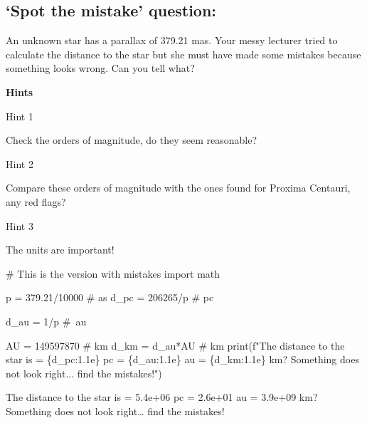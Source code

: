 \documentclass[
  letterpaper,
  DIV=11,
  numbers=noendperiod]{scrreprt}
\newenvironment{Shaded}{\begin{snugshade}}{\end{snugshade}}
\newcommand{\BuiltInTok}[1]{\textcolor[rgb]{0.00,0.23,0.31}{#1}}
\newcommand{\CommentTok}[1]{\textcolor[rgb]{0.37,0.37,0.37}{#1}}
\newcommand{\DecValTok}[1]{\textcolor[rgb]{0.68,0.00,0.00}{#1}}
\newcommand{\FloatTok}[1]{\textcolor[rgb]{0.68,0.00,0.00}{#1}}
\newcommand{\ImportTok}[1]{\textcolor[rgb]{0.00,0.46,0.62}{#1}}
\newcommand{\NormalTok}[1]{\textcolor[rgb]{0.00,0.23,0.31}{#1}}
\newcommand{\OperatorTok}[1]{\textcolor[rgb]{0.37,0.37,0.37}{#1}}
\newcommand{\SpecialCharTok}[1]{\textcolor[rgb]{0.37,0.37,0.37}{#1}}
\newcommand{\SpecialStringTok}[1]{\textcolor[rgb]{0.13,0.47,0.30}{#1}}
\begin{document}
\hypertarget{spot-the-mistake-question}{%
\subsection{`Spot the mistake'
question:}\label{spot-the-mistake-question}}

An unknown star has a parallax of 379.21 mas. Your messy lecturer tried
to calculate the distance to the star but she must have made some
mistakes because something looks wrong. Can you tell what?

\textbf{Hints}

Hint 1

Check the orders of magnitude, do they seem reasonable?

Hint 2

Compare these orders of magnitude with the ones found for Proxima
Centauri, any red flags?

Hint 3

The units are important!

\begin{Shaded}
\begin{Highlighting}[]
\CommentTok{\# This is the version with mistakes}
\ImportTok{import}\NormalTok{ math}

\NormalTok{p }\OperatorTok{=} \FloatTok{379.21}\OperatorTok{/}\DecValTok{10000} \CommentTok{\# as }
\NormalTok{d\_pc }\OperatorTok{=} \DecValTok{206265}\OperatorTok{/}\NormalTok{p }\CommentTok{\# pc}

\NormalTok{d\_au }\OperatorTok{=} \DecValTok{1}\OperatorTok{/}\NormalTok{p }\CommentTok{\# au}

\NormalTok{AU }\OperatorTok{=} \DecValTok{149597870} \CommentTok{\# km}
\NormalTok{d\_km }\OperatorTok{=}\NormalTok{ d\_au}\OperatorTok{*}\NormalTok{AU }\CommentTok{\# km}
\BuiltInTok{print}\NormalTok{(}\SpecialStringTok{f"The distance to the star is = }\SpecialCharTok{\{}\NormalTok{d\_pc}\SpecialCharTok{:1.1e\}}\SpecialStringTok{ pc = }\SpecialCharTok{\{}\NormalTok{d\_au}\SpecialCharTok{:1.1e\}}\SpecialStringTok{ au = }\SpecialCharTok{\{}\NormalTok{d\_km}\SpecialCharTok{:1.1e\}}\SpecialStringTok{ km? Something does not look right... find the mistakes!"}\NormalTok{)}
\end{Highlighting}
\end{Shaded}

The distance to the star is = 5.4e+06 pc = 2.6e+01 au = 3.9e+09 km?
Something does not look right\ldots{} find the mistakes!
\end{document}

